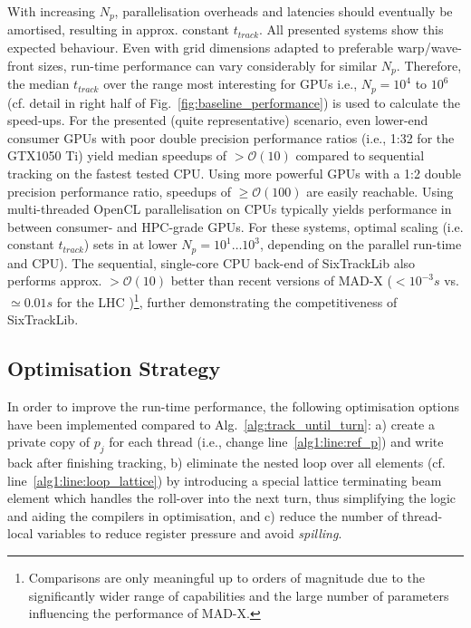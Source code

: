 \documentclass[a4paper,
               refpage,       %
               keeplastbox,   %
               ]{jacow}
\begin{document}
With increasing $N_{p}$, parallelisation overheads and latencies should eventually be amortised, resulting in approx. constant $t_{track}$. All presented systems show this expected behaviour. Even with grid dimensions adapted to preferable warp/wave-front sizes, run-time performance can vary considerably for similar $N_{p}$. Therefore, the median $t_{track}$ over the range most interesting for GPUs i.e., $N_{p} = 10^4$ to $10^6$ (cf. detail in right half of Fig.~\ref{fig:baseline_performance}) is used to calculate the speed-ups. For the presented (quite representative) scenario, even lower-end consumer GPUs with poor double precision performance ratios (i.e., 1:32 for the GTX1050 Ti) yield median speedups of $>\mathcal{O}(10)$ compared to sequential tracking on the fastest tested CPU. Using more powerful GPUs with a 1:2 double precision performance ratio, speedups of $\geq \mathcal{O}(100)$ are easily reachable. Using multi-threaded OpenCL parallelisation on CPUs typically yields performance in between consumer- and HPC-grade GPUs. For these systems, optimal scaling (i.e. constant $t_{track}$) sets in at lower $N_{p} = 10^1 \ldots 10^3$, depending on the parallel run-time and CPU). The sequential, single-core CPU back-end of SixTrackLib also performs approx. $>\mathcal{O}(10)$ better than recent versions of MAD-X ($< 10^{-3} s$ vs. $\simeq 0.01 s$ for the LHC \cite{person-madx-2021})\footnote{Comparisons are only meaningful up to orders of magnitude due to the significantly wider range of capabilities and the large number of parameters influencing the performance of MAD-X.}, further demonstrating the competitiveness of SixTrackLib.
\subsection{Optimisation Strategy}
In order to improve the run-time performance, the following optimisation options have been implemented compared to %
Alg.~\ref{alg:track_until_turn}:
a) create a private copy of $p_j$ for each thread (i.e., change line~\ref{alg1:line:ref_p}) and write back after finishing tracking, b) eliminate the nested loop over all elements (cf. line~\ref{alg1:line:loop_lattice}) by introducing a special lattice terminating beam element which handles the roll-over into the next turn, thus simplifying the logic and aiding the compilers in optimisation, and c) reduce the number of thread-local variables to reduce register pressure and avoid \textit{spilling}.
\end{document}
